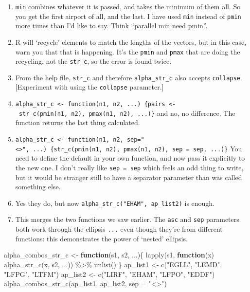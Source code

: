 \documentclass[
]{book}
\newenvironment{Shaded}{\begin{snugshade}}{\end{snugshade}}
\newcommand{\AttributeTok}[1]{\textcolor[rgb]{0.77,0.63,0.00}{#1}}
\newcommand{\ControlFlowTok}[1]{\textcolor[rgb]{0.13,0.29,0.53}{\textbf{#1}}}
\newcommand{\FunctionTok}[1]{\textcolor[rgb]{0.00,0.00,0.00}{#1}}
\newcommand{\NormalTok}[1]{#1}
\newcommand{\OtherTok}[1]{\textcolor[rgb]{0.56,0.35,0.01}{#1}}
\newcommand{\SpecialCharTok}[1]{\textcolor[rgb]{0.00,0.00,0.00}{#1}}
\newcommand{\StringTok}[1]{\textcolor[rgb]{0.31,0.60,0.02}{#1}}
\providecommand{\tightlist}{%
  \setlength{\itemsep}{0pt}\setlength{\parskip}{0pt}}
\begin{document}
\begin{enumerate}
\def\labelenumi{\arabic{enumi})}
\tightlist
\item
  \texttt{min} combines whatever it is passed, and takes the minimum of them all. So you get the first airport of all, and the last. I have used \texttt{min} instead of \texttt{pmin} more times than I'd like to say. Think ``parallel min need pmin''.
\item
  R will `recycle' elements to match the lengths of the vectors, but in this case, warn you that that is happening. It's the \texttt{pmin} and \texttt{pmax} that are doing the recycling, not the \texttt{str\_c}, so the error is found twice.
\item
  From the help file, \texttt{str\_c} and therefore \texttt{alpha\_str\_c} also accepts \texttt{collapse}. {[}Experiment with using the \texttt{collapse} parameter.{]}
\item
  \texttt{alpha\_str\_c\ \textless{}-\ function(n1,\ n2,\ ...)\ \{pairs\ \textless{}-\ str\_c(pmin(n1,\ n2),\ pmax(n1,\ n2),\ ...)\}} and no, no difference. The function returns the last thing calculated.
\item
  \texttt{alpha\_str\_c\ \textless{}-\ function(n1,\ n2,\ sep="\textless{}\textgreater{}",\ ...)\ \{str\_c(pmin(n1,\ n2),\ pmax(n1,\ n2),\ sep\ =\ sep,\ ...)\}} You need to define the default in your own function, and now pass it explicitly to the new one. I don't really like \texttt{sep\ =\ sep} which feels an odd thing to write, but it would be stranger still to have a separator parameter than was called something else.
\item
  Yes they do, but now \texttt{alpha\_str\_c("EHAM",\ ap\_list2)} is enough.
\item
  This merges the two functions we saw earlier. The \texttt{asc} and \texttt{sep} parameters both work through the ellipsis \texttt{...} even though they're from different functions: this demonstrates the power of `nested' ellipsis.
\end{enumerate}

\begin{Shaded}
\begin{Highlighting}[]
\NormalTok{alpha\_combos\_str\_c }\OtherTok{\textless{}{-}} \ControlFlowTok{function}\NormalTok{(s1, s2, ...)\{}
  \FunctionTok{lapply}\NormalTok{(s1, }\ControlFlowTok{function}\NormalTok{(x) }\FunctionTok{alpha\_str\_c}\NormalTok{(x, s2, ...)) }\SpecialCharTok{\%\textgreater{}\%} 
    \FunctionTok{unlist}\NormalTok{()}
\NormalTok{\}}
\NormalTok{ap\_list1 }\OtherTok{\textless{}{-}} \FunctionTok{c}\NormalTok{(}\StringTok{"EGLL"}\NormalTok{, }\StringTok{"LEMD"}\NormalTok{, }\StringTok{"LFPG"}\NormalTok{, }\StringTok{"LTFM"}\NormalTok{)}
\NormalTok{ap\_list2 }\OtherTok{\textless{}{-}} \FunctionTok{c}\NormalTok{(}\StringTok{"LIRF"}\NormalTok{, }\StringTok{"EHAM"}\NormalTok{, }\StringTok{"LFPO"}\NormalTok{, }\StringTok{"EDDF"}\NormalTok{)}
\FunctionTok{alpha\_combos\_str\_c}\NormalTok{(ap\_list1, ap\_list2, }\AttributeTok{sep =} \StringTok{"\textless{}\textgreater{}"}\NormalTok{)}
\end{Highlighting}
\end{Shaded}
\end{document}
